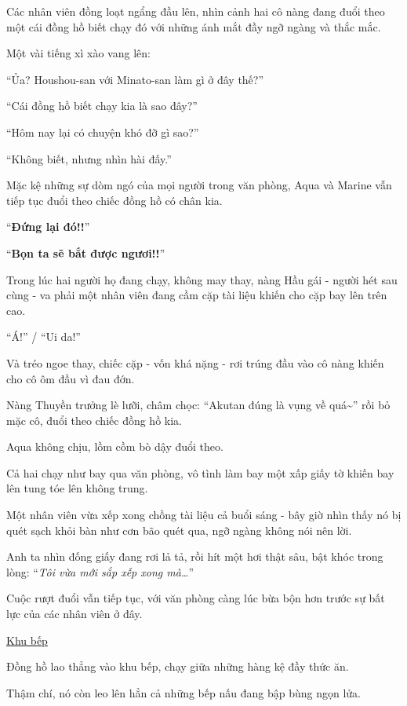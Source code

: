\documentclass[../main.tex]{subfiles}
\begin{document}
Các nhân viên đồng loạt ngẩng đầu lên, nhìn cảnh hai cô nàng đang đuổi theo một cái đồng hồ biết chạy đó với những ánh mắt đầy ngỡ ngàng và thắc mắc.

Một vài tiếng xì xào vang lên:

``Ủa? Houshou-san với Minato-san làm gì ở đây thế?''

``Cái đồng hồ biết chạy kia là sao đây?''

``Hôm nay lại có chuyện khó đỡ gì sao?''

``Không biết, nhưng nhìn hài đấy.''

Mặc kệ những sự dòm ngó của mọi người trong văn phòng, Aqua và Marine vẫn tiếp tục đuổi theo chiếc đồng hồ có chân kia.

``\textbf{Đứng lại đó!!}''

``\textbf{Bọn ta sẽ bắt được ngươi!!}''

Trong lúc hai người họ đang chạy, không may thay, nàng Hầu gái - người hét sau cùng - va phải một nhân viên đang cầm cặp tài liệu khiến cho cặp bay lên trên cao.

``Á!'' / ``Ui da!''

Và tréo ngoe thay, chiếc cặp - vốn khá nặng - rơi trúng đầu vào cô nàng khiến cho cô ôm đầu vì đau đớn.

Nàng Thuyền trưởng lè lưỡi, châm chọc: ``Akutan đúng là vụng về quá\~{}'' rồi bỏ mặc cô, đuổi theo chiếc đồng hồ kia.

Aqua không chịu, lồm cồm bò dậy đuổi theo.

Cả hai chạy như bay qua văn phòng, vô tình làm bay một xấp giấy tờ khiến bay lên tung tóe lên không trung.

Một nhân viên vừa xếp xong chồng tài liệu cả buổi sáng - bây giờ nhìn thấy nó bị quét sạch khỏi bàn như cơn bão quét qua, ngỡ ngàng không nói nên lời.

Anh ta nhìn đống giấy đang rơi lả tả, rồi hít một hơi thật sâu, bật khóc trong lòng: ``\textit{Tôi vừa mới sắp xếp xong mà\dots}''

Cuộc rượt đuổi vẫn tiếp tục, với văn phòng càng lúc bừa bộn hơn trước sự bất lực của các nhân viên ở đây.

\begin{center}
    \uline{Khu bếp}
\end{center}

Đồng hồ lao thẳng vào khu bếp, chạy giữa những hàng kệ đầy thức ăn.

Thậm chí, nó còn leo lên hẳn cả những bếp nấu đang bập bùng ngọn lửa.
\end{document}
